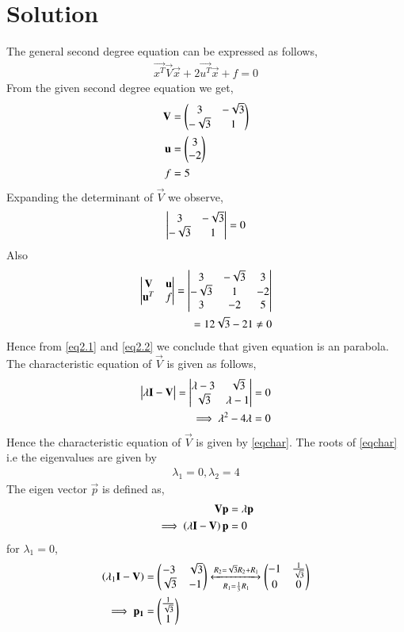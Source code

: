 \documentclass[journal,12pt,twocolumn]{IEEEtran}
\begin{document}
\section{Solution}
The general second degree equation can be expressed as follows,
\begin{align}
\vec{x^T}\vec{V}\vec{x}+2\vec{u^T}\vec{x}+f=0\label{eqmain}
\end{align}
From the given second degree equation we get,
\begin{align}
\mathbf{V} &= \begin{pmatrix}3&-\sqrt{3}\\-\sqrt{3}&1\end{pmatrix}\\ \label{given1}
\mathbf{u} &= \begin{pmatrix}3\\-2\end{pmatrix}\\ 
f &= 5 \label{given2}
\end{align}
Expanding the determinant of $\vec{V}$ we observe, 
\begin{align}
\begin{vmatrix}3&-\sqrt{3}\\-\sqrt{3}&1\end{vmatrix} = 0 \label{eq2.1}
\end{align}
Also
\begin{align}
    \begin{vmatrix}\mathbf{V} & \mathbf{u} \\ \mathbf{u}^T & f\end{vmatrix}=
    \begin{vmatrix}3 &-\sqrt{3} & 3 \\ -\sqrt{3}&1 & -2 \\ 3 & -2 & 5\end{vmatrix} \\
    = 12\sqrt{3}-21\neq 0\label{eq2.2}
\end{align}
Hence from \eqref{eq2.1} and \eqref{eq2.2} we conclude that given equation is an parabola. The characteristic equation of $\vec{V}$ is given as follows,
\begin{align}
\begin{vmatrix}\lambda\mathbf{I}-\mathbf{V}\end{vmatrix} = \begin{vmatrix}\lambda-3&\sqrt{3}\\\sqrt{3}&\lambda-1\end{vmatrix} &= 0\\
\implies \lambda^2-4\lambda &= 0\label{eqchar}
\end{align}
Hence the characteristic equation of $\vec{V}$ is given by \eqref{eqchar}. The roots of \eqref{eqchar} i.e the eigenvalues are given by
\begin{align}
\lambda_1=0, \lambda_2=4\label{eqeigenvals}    
\end{align}
The eigen vector $\vec{p}$ is defined as, 
\begin{align}
\mathbf{V}\mathbf{p} &= \lambda\mathbf{p}\\
\implies\left(\lambda\mathbf{I}-\mathbf{V}\right)\mathbf{p}&=0
\end{align}
for $\lambda_1=0$,
\begin{align}
\left(\lambda_1\mathbf{I}-\mathbf{V}\right)&=\begin{pmatrix}-3&\sqrt{3}\\\sqrt{3}&-1\end{pmatrix}\xleftrightarrow[R_1=\frac{1}{3}R_1]{R_2=\sqrt{3}R_2+R_1}\begin{pmatrix}-1&\frac{1}{\sqrt{3}}\\0&0\end{pmatrix}\\
\implies\mathbf{p_1}&=\begin{pmatrix}\frac{1}{\sqrt{3}}\\1\end{pmatrix} \label{eq2.3}
\end{align}
\end{document}
